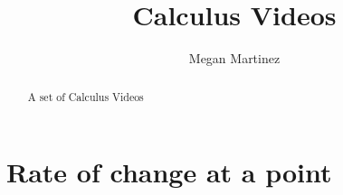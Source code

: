 \documentclass{xourse}
\title{Calculus Videos}
\author{Megan Martinez}
\begin{document}
\begin{abstract} A set of Calculus Videos \end{abstract}

\maketitle


\part{Rate of change at a point}






\end{document}
